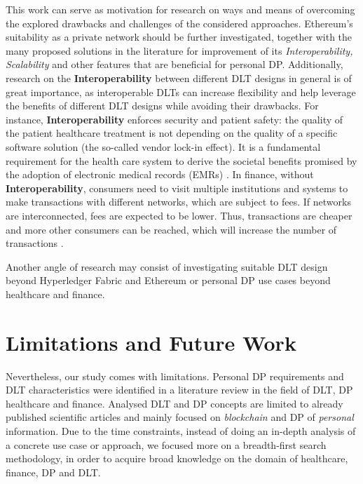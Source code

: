 This work can serve as motivation for research on ways and means of overcoming the explored drawbacks and challenges of the considered approaches. Ethereum's suitability as a private network should be further investigated, together with the many proposed solutions in the literature for improvement of its \textit{Interoperability, Scalability} and other features that are beneficial for personal DP. Additionally, research on the \textbf{Interoperability} between different DLT designs in general is of great importance, as interoperable DLTs can increase flexibility and help leverage the benefits of different DLT designs while avoiding their drawbacks. For instance,  \textbf{Interoperability} enforces security and patient safety: the quality of the patient healthcare treatment is not depending on the quality of a specific software solution (the so-called vendor lock-in effect). It is a fundamental requirement for the health care system to derive the societal benefits promised by the adoption of electronic medical records (EMRs) \cite{health_interop}. In finance, without \textbf{Interoperability}, consumers need to visit multiple institutions and systems to make transactions with different networks, which are subject to fees. If networks are interconnected, fees are expected to be lower. Thus, transactions are cheaper and more other consumers can be reached, which will increase the number of transactions \cite{fin_interop}.

Another angle of research may consist of investigating suitable DLT design beyond Hyperledger Fabric and Ethereum or personal DP use cases beyond healthcare and finance.

\section{Limitations and Future Work}
\label{sec:LimitationsAndFutureWork}

Nevertheless, our study comes with limitations. Personal DP requirements and DLT characteristics were identified in a literature review in the field of DLT, DP healthcare and finance. Analysed DLT and DP concepts are limited to already published scientific articles and mainly focused on \textit{blockchain} and DP of \textit{personal} information. Due to the time constraints, instead of doing an in-depth analysis of a concrete use case or approach, we focused more on a breadth-first search methodology, in order to acquire broad knowledge on the domain of healthcare, finance, DP and DLT. 

